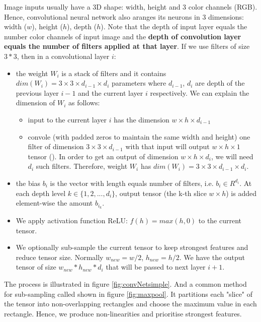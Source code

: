 Image inputs usually have a 3D shape: width, height and 3 color channels (RGB). Hence, convolutional neural network also aranges its neurons in 3 dimensions: width ($w$), height ($h$), depth ($h$). Note that the depth of input layer equals the number color channels of input image and the \textbf{depth of convolution layer equals the number of filters applied at that layer}. If we use filters of size $3*3$, then in a convolutional layer $i$:
\begin{itemize}
	\item the weight $W_i$ is a stack of filters and it contains $dim(W_i) = 3 \times 3 \times d_{i-1} \times d_i$ parameters where $d_{i-1}$, $d_i$ are depth of the previous layer $i-1$ and the current layer $i$ respectively. We can explain the dimension of $W_i$ as follows:
	\begin{itemize}
		\item input to the current layer $i$ has the dimension $w \times h \times d_{i-1}$ 
		\item convole (with padded zeros to maintain the same width and height) one filter of dimension $3 \times 3 \times d_{i-1}$ with that input will output $w \times h \times 1$ tensor (). In order to get an output of dimension $w \times h \times d_i$, we will need $d_i$ such filters. Therefore, weight $W_i$ has $dim(W_i) = 3 \times 3 \times d_{i-1} \times d_i$.
	\end{itemize}
	\item the bias $b_i$ is the vector with length equals number of filters, i.e. $b_i \in R^{d_i}$. At each depth level $k \in \{1, 2, ..., d_i\}$, output tensor (the k-th slice $w\times h$) is added element-wise the amount $b_{i_{k}}$.

	\item We apply activation function ReLU: $f(h) = max(h, 0)$ to the current tensor.
	\item We optionally sub-sample the current tensor to keep strongest features and reduce tensor size. Normally $w_{new} = w / 2$, $h_{new} = h/2$. We have the output tensor of size $w_{new} * h_{new} * d_i$ that will be passed to next layer $i+1$.
\end{itemize}  
The process is illustrated in figure \ref{fig:convNetsimple}. And a common method for sub-sampling called  shown in figure \ref{fig:maxpool}. It partitions each "slice" of the tensor into non-overlapping rectangles and choose the maximum value in each rectangle. Hence, we produce non-linearities and prioritise strongest features.

